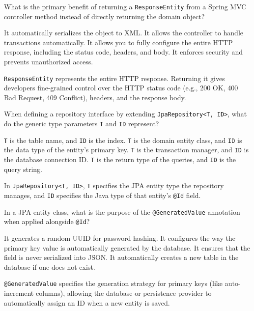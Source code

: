 \question[4]
What is the primary benefit of returning a \texttt{ResponseEntity} from a Spring MVC controller method instead of directly returning the domain object?
\begin{choices}
  \choice It automatically serializes the object to XML.
  \choice It allows the controller to handle transactions automatically.
  \CorrectChoice It allows you to fully configure the entire HTTP response, including the status code, headers, and body.
  \choice It enforces security and prevents unauthorized access.
\end{choices}
\begin{solution}
  \texttt{ResponseEntity} represents the entire HTTP response. Returning it gives developers fine-grained control over the HTTP status code (e.g., 200 OK, 400 Bad Request, 409 Conflict), headers, and the response body.
\end{solution}

\question[4]
When defining a repository interface by extending \texttt{JpaRepository<T, ID>}, what do the generic type parameters \texttt{T} and \texttt{ID} represent?
\begin{choices}
  \choice \texttt{T} is the table name, and \texttt{ID} is the index.
  \CorrectChoice \texttt{T} is the domain entity class, and \texttt{ID} is the data type of the entity's primary key.
  \choice \texttt{T} is the transaction manager, and \texttt{ID} is the database connection ID.
  \choice \texttt{T} is the return type of the queries, and \texttt{ID} is the query string.
\end{choices}
\begin{solution}
  In \texttt{JpaRepository<T, ID>}, \texttt{T} specifies the JPA entity type the repository manages, and \texttt{ID} specifies the Java type of that entity's \texttt{@Id} field.
\end{solution}

\question[4]
In a JPA entity class, what is the purpose of the \texttt{@GeneratedValue} annotation when applied alongside \texttt{@Id}?
\begin{choices}
  \choice It generates a random UUID for password hashing.
  \CorrectChoice It configures the way the primary key value is automatically generated by the database.
  \choice It ensures that the field is never serialized into JSON.
  \choice It automatically creates a new table in the database if one does not exist.
\end{choices}
\begin{solution}
  \texttt{@GeneratedValue} specifies the generation strategy for primary keys (like auto-increment columns), allowing the database or persistence provider to automatically assign an ID when a new entity is saved.
\end{solution}

